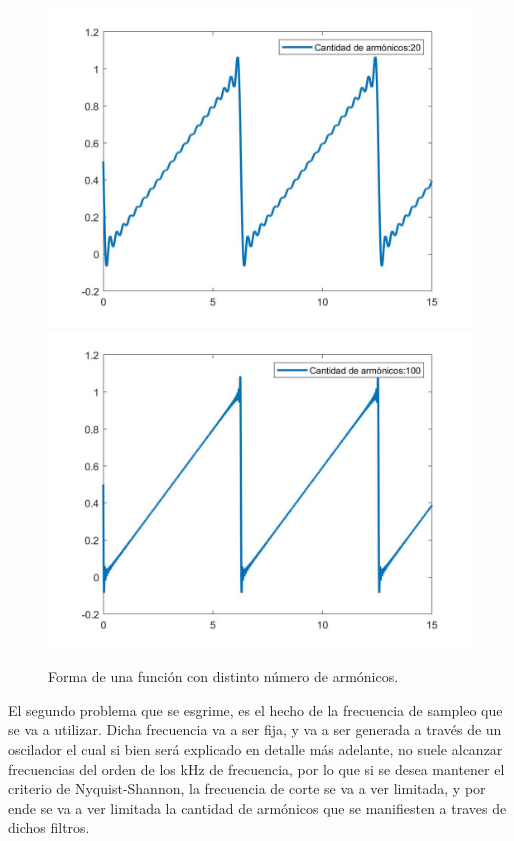 \documentclass[../../ASSD_TP1_G7.tex]{subfiles}
\begin{document}
\begin{figure}[H]
\begin{centering}
\includegraphics[scale=0.24]{Imagenes/20armonicos}\includegraphics[scale=0.24]{Imagenes/100armonicos}\caption{Forma de una función con distinto número de armónicos.\label{fig:Forma-de-una}}
\par\end{centering}
\end{figure}

El segundo problema que se esgrime, es el hecho de la frecuencia de
sampleo que se va a utilizar. Dicha frecuencia va a ser fija, y va
a ser generada a través de un oscilador el cual si bien será explicado
en detalle más adelante, no suele alcanzar frecuencias del orden de
los kHz de frecuencia, por lo que si se desea mantener el criterio
de Nyquist-Shannon, la frecuencia de corte se va a ver limitada, y
por ende se va a ver limitada la cantidad de armónicos que se manifiesten
a traves de dichos filtros.
\end{document}
